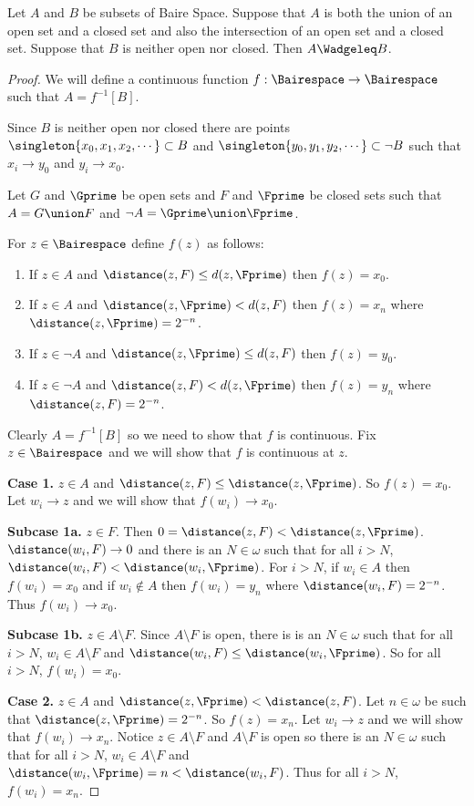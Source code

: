\documentclass[oneside,12pt]{amsart}
\begin{document}
\begin{theorem} Let $A$ and $B$ be subsets of Baire Space. Suppose that $A$ is both the union of an open
set and a closed set and also the intersection of an open set and a closed set. Suppose that $B$ is neither open nor closed.
Then $A \Wadgeleq B$.
\end{theorem}
\begin{proof}
We will define a continuous function $f:\Bairespace\to\Bairespace$ such that $A=f^{-1}[B]$.

Since $B$ is neither open nor closed there are points $\singleton{x_0,x_1,x_2,\cdots} \subset B$ and
$\singleton{y_0,y_1,y_2,\cdots}\subset \neg B$ such that $x_i \to y_0$ and $y_i \to x_0$.

Let $G$ and $\Gprime$ be open sets and $F$ and $\Fprime$ be closed sets such that
$A=G\union F$ and $\neg A = \Gprime \union \Fprime$.

For $z\in\Bairespace$ define $f(z)$ as follows:
\begin{enumerate}
\item If $z\in A$ and $\distance(z,F) \leq d(z, \Fprime)$ then $f(z) = x_0$.
\item If $z\in A$ and $\distance(z,\Fprime) < d(z, F)$ then $f(z) = x_n$ where $\distance(z,\Fprime) = 2^{-n}$.
\item If $z\in \neg A$ and $\distance(z,\Fprime) \leq d(z, F)$ then $f(z) = y_0$.
\item If $z\in \neg A$ and $\distance(z,F) < d(z, \Fprime)$ then $f(z) = y_n$ where $\distance(z,F) = 2^{-n}$.
\end{enumerate}

Clearly $A=f^{-1}[B]$ so we need to show that $f$ is continuous. Fix $z\in\Bairespace$ and we will show that $f$ is continuous
at $z$.

\textbf{Case 1.} $z\in A$ and $\distance(z,F) \leq \distance(z, \Fprime)$. So $f(z) = x_0$.
Let $w_i \to z$ and we will show that $f(w_i) \to x_0$.

\textbf{Subcase 1a.} $z\in F$. Then $0 = \distance(z,F) < \distance(z, \Fprime)$.
$\distance(w_i, F) \to 0$ and there is an $N\in\omega$ such that for all $i>N$, $\distance(w_i, F) < \distance(w_i, \Fprime)$.
For $i>N$, if $w_i\in A$ then $f(w_i) = x_0$ and if $w_i\not\in A$
then $f(w_i) = y_n$ where $\distance(w_i, F) = 2^{-n}$. Thus $f(w_i) \to x_0$.

\textbf{Subcase 1b.} $z\in A\setminus F$. Since $A\setminus F$ is open, there is is an $N\in\omega$ such that for all $i>N$, $w_i\in A\setminus F$
and $\distance(w_i, F) \leq \distance(w_i, \Fprime)$. So for all $i>N$, $f(w_i) = x_0$.

\textbf{Case 2.} $z\in A$ and $\distance(z,\Fprime) < \distance(z, F)$. Let $n\in\omega$ be such that $\distance(z,\Fprime) = 2^{-n}$.
So $f(z) = x_n$.
Let $w_i \to z$ and we will show that $f(w_i) \to x_n$. Notice $z\in A\setminus F$ and $A\setminus F$ is open so there is an $N\in\omega$
such that for all $i>N$, $w_i \in A\setminus F$ and $\distance(w_i, \Fprime) = n < \distance(w_i, F)$. Thus for all $i>N$,
$f(w_i) = x_n$.

\end{proof}
\end{document}
